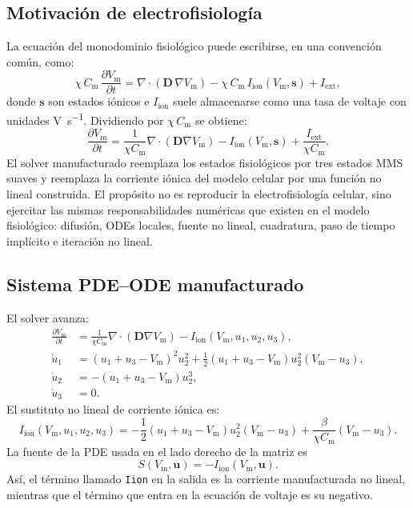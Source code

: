 \documentclass[11pt,a4paper]{article}
\newcommand{\code}[1]{\texttt{\small #1}}
\newcommand{\Vm}{V_{\text{m}}}
\newcommand{\Iion}{I_{\mathrm{ion}}}
\newcommand{\Dten}{\mathbf{D}}
\newcommand{\grad}{\nabla}
\newcommand{\divg}{\nabla\!\cdot}
\begin{document}
\subsection{Motivación de electrofisiología}

La ecuación del monodominio fisiológico puede escribirse, en una convención común, como:
%
\begin{equation}
  \chi \, C_{\text{m}} \, \frac{\partial \Vm}{\partial t}
  =
  \divg(\Dten\,\grad \Vm)
  - \chi \, C_{\text{m}} \, \Iion(\Vm,\mathbf{s})
  + I_{\mathrm{ext}},
  \label{eq:phys-monodomain}
\end{equation}
%
donde $\mathbf{s}$ son estados iónicos e $\Iion$ suele almacenarse como una tasa de voltaje
con unidades \si{\volt\per\second}. Dividiendo por $\chi \, C_{\text{m}}$ se obtiene:
%
\begin{equation}
  \frac{\partial \Vm}{\partial t}
  =
  \frac{1}{\chi C_{\text{m}}}\divg(\Dten\grad\Vm)
  - \Iion(\Vm,\mathbf{s})
  + \frac{I_{\mathrm{ext}}}{\chi C_{\text{m}}}.
\end{equation}
%
El solver manufacturado reemplaza los estados fisiológicos por tres estados MMS suaves y
reemplaza la corriente iónica del modelo celular por una función no lineal construida. El
propósito no es reproducir la electrofisiología celular, sino ejercitar las mismas
responsabilidades numéricas que existen en el modelo fisiológico: difusión, ODEs locales, fuente no lineal, cuadratura, paso de
tiempo implícito e iteración no lineal.

\subsection{Sistema PDE--ODE manufacturado}

El solver avanza:
%
\begin{align}
  \frac{\partial \Vm}{\partial t}
  &=
  \frac{1}{\chi C_{\text{m}}}\divg(\Dten\grad\Vm)
  - \Iion(\Vm,u_1,u_2,u_3),
  \label{eq:mms-pde}\\
  \dot u_1
  &=
  (u_1+u_3-\Vm)^2 u_2^2
  + \frac{1}{2}(u_1+u_3-\Vm)u_2^2(\Vm-u_3),
  \label{eq:mms-u1}\\
  \dot u_2
  &=
  -(u_1+u_3-\Vm)u_2^3,
  \label{eq:mms-u2}\\
  \dot u_3 &= 0.
  \label{eq:mms-u3}
\end{align}
%
El sustituto no lineal de corriente iónica es:
%
\begin{equation}
  \Iion(\Vm,u_1,u_2,u_3)
  =
  -\frac{1}{2}(u_1+u_3-\Vm)u_2^2(\Vm-u_3)
  + \frac{\beta}{\chi C_{\text{m}}}(\Vm-u_3).
  \label{eq:mms-iion}
\end{equation}
%
La fuente de la PDE usada en el lado derecho de la matriz es
%
\begin{equation}
  S(\Vm,\mathbf{u})=-\Iion(\Vm,\mathbf{u}).
  \label{eq:mms-source}
\end{equation}
%
Así, el término llamado \code{Iion} en la salida es la corriente manufacturada no lineal,
mientras que el término que entra en la ecuación de voltaje es su negativo.
\end{document}
